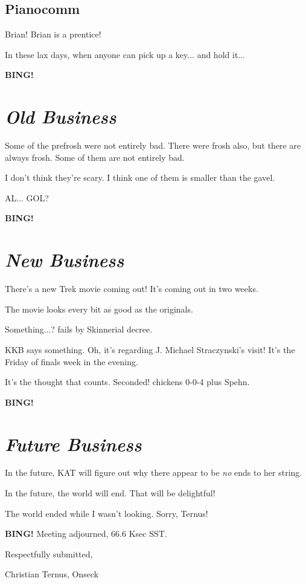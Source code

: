 \documentclass[10pt]{article}
\newcommand{\bing}{{\bf BING!} }
\newcommand{\goto}[1]{\bing \vskip 12pt \section*{{\em{#1}}}}
\newcommand{\ps}{ plus Spehn\xspace}
\begin{document}
\subsection*{Pianocomm}

Brian!  Brian is a prentice!

In these lax days, when anyone can pick up a key... and hold it...

\goto{Old Business}

Some of the prefrosh were not entirely bad.  There were frosh also,
but there are always frosh.  Some of them are not entirely bad.

I don't think they're scary.  I think one of them is smaller than the
gavel.

AL... GOL?

\goto{New Business}

There's a new Trek movie coming out!  It's coming out in two weeks.

The movie looks every bit as good as the originals.

Something...? fails by Skinnerial decree.

KKB says something.  Oh, it's regarding J. Michael Straczynski's
visit!  It's the Friday of finals week in the evening.

It's the thought that counts.  Seconded!  chickens 0-0-4\ps.

\goto{Future Business}

In the future, KAT will figure out why there appear to be \emph{no}
ends to her string.

In the future, the world will end.  That will be delightful!

The world ended while I wasn't looking.  Sorry, Ternus!

\bing
\noindent
Meeting adjourned, 66.6 Ksec SST.

\vspace{18pt}

\centerline{Respectfully submitted,}
\centerline{Christian Ternus, Onseck}
\end{document}
